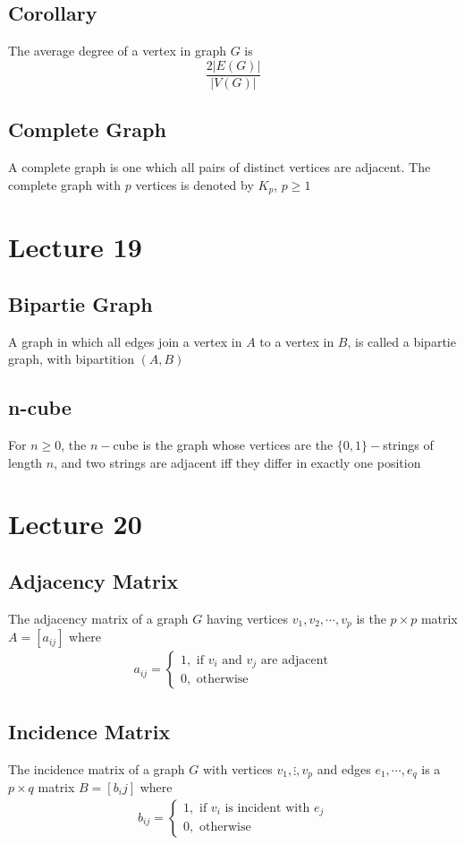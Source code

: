 \documentclass[11pt]{article}
\begin{document}
\subsection{Corollary}
The average degree of a vertex in graph $G$ is \[\dfrac{2|E(G)|}{|V(G)|}\]
\subsection{Complete Graph}
A complete graph is one which all pairs of distinct vertices are adjacent. The complete graph with $p$ vertices is denoted by $K_p$, $p\geq1$


\section{Lecture 19}
\subsection{Bipartie Graph}
A graph in which all edges join a vertex in $A$ to a vertex in $B$, is called a bipartie graph, with bipartition $(A,B)$
\subsection{n-cube}
For $n\geq0$, the $n-$cube is the graph whose vertices are the $\{0,1\}-$strings of length $n$, and two strings are adjacent iff they differ in exactly one position

\section{Lecture 20}
\subsection{Adjacency Matrix}
The adjacency matrix of a graph $G$ having vertices $v_1,v_2,\cdots,v_p$ is the $p\times p$ matrix $A=[a_{ij}]$ where 
\begin{align*}
  a_{ij} = 
  \begin{cases}
    1,\text{ if $v_i$ and $v_j$ are adjacent} \\
    0,\text{ otherwise}
  \end{cases}
\end{align*}
\subsection{Incidence Matrix}
The incidence matrix of a graph $G$ with vertices $v_1,\vdots,v_p$ and edges $e_1,\cdots,e_q$ is a $p\times q$ matrix $B=[b_ij]$ where
\begin{align*}
  b_{ij}=
  \begin{cases}
    1,\text{ if $v_i$ is incident with $e_j$} \\
    0,\text{ otherwise}
  \end{cases}
\end{align*}
\end{document}
